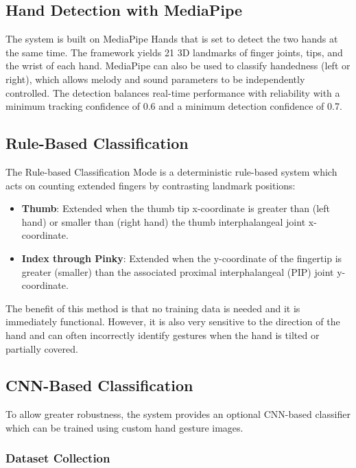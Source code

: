 \documentclass[conference]{IEEEtran}
\begin{document}
\subsection{Hand Detection with MediaPipe}

The system is built on MediaPipe Hands \cite{zhang2020mediapipe} that is set to detect the two hands at the same time. The framework yields 21 3D landmarks of finger joints, tips, and the wrist of each hand. MediaPipe can also be used to classify handedness (left or right), which allows melody and sound parameters to be independently controlled. The detection balances real-time performance with reliability with a minimum tracking confidence of 0.6 and a minimum detection confidence of 0.7.

\subsection{Rule-Based Classification}

The Rule-based Classification Mode is a deterministic rule-based system which acts on counting extended fingers by contrasting landmark positions:

\begin{itemize}
\item \textbf{Thumb}: Extended when the thumb tip x-coordinate is greater than (left hand) or smaller than (right hand) the thumb interphalangeal joint x-coordinate.
\item \textbf{Index through Pinky}: Extended when the y-coordinate of the fingertip is greater (smaller) than the associated proximal interphalangeal (PIP) joint y-coordinate.
\end{itemize}

The benefit of this method is that no training data is needed and it is immediately functional. However, it is also very sensitive to the direction of the hand and can often incorrectly identify gestures when the hand is tilted or partially covered.

\subsection{CNN-Based Classification}

To allow greater robustness, the system provides an optional CNN-based classifier which can be trained using custom hand gesture images.

\subsubsection{Dataset Collection}
\end{document}
